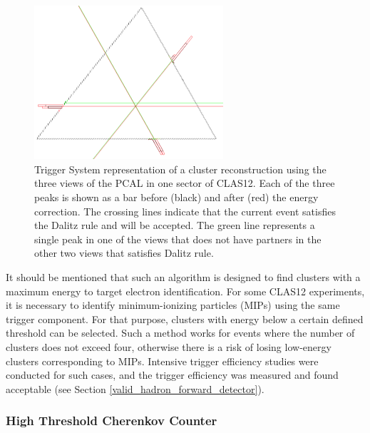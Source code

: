 \begin{figure}[htp]
	\begin{center}
		\centering
		\includegraphics[width=7cm]{img/pcal1.png}
		\caption{Trigger System representation of a cluster reconstruction using the three views of the
                  PCAL in one sector of CLAS12. Each of the three peaks is shown as a bar before (black) and after
                  (red) the energy correction. The crossing lines indicate that the current event satisfies the Dalitz
                  rule and will be accepted. The green line represents a single peak in one of the views that does not
                  have partners in the other two views that satisfies Dalitz rule.}
		\label{fig:PCAL}
	\end{center}
\end{figure} 

It should be mentioned that such an algorithm is designed to find clusters with a maximum energy to target
electron identification. For some CLAS12 experiments, it is necessary to identify minimum-ionizing particles
(MIPs) using the same trigger component. For that purpose, clusters with energy below a certain defined
threshold can be selected. Such a method works for events where the number of clusters does not exceed
four, otherwise there is a risk of losing low-energy clusters corresponding to MIPs. Intensive trigger
efficiency studies were conducted for such cases, and the trigger efficiency was measured and found
acceptable (see Section \ref{valid_hadron_forward_detector}).

\subsubsection{High Threshold Cherenkov Counter}
\label{sec:HTCC}

